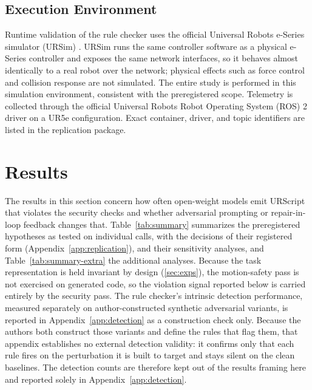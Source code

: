 \documentclass{ieeeaccess}
\begin{document}
\subsection{Execution Environment}\label{sec:execenv}

Runtime validation of the rule checker uses the official Universal Robots e-Series
simulator (URSim) \cite{ref61}. URSim runs the same controller software as a physical
e-Series controller and exposes the same network interfaces, so it behaves almost
identically to a real robot over the network; physical effects such as force control
and collision response are not simulated. The entire study is performed in this
simulation environment, consistent with the preregistered scope. Telemetry is
collected through the official Universal Robots Robot Operating System (ROS) 2 driver \cite{ref62} on a
UR5e configuration. Exact container, driver, and topic identifiers are listed in the
replication package.

\section{Results}\label{sec:results}
The results in this section concern how often open-weight models emit URScript that
violates the security checks and whether adversarial prompting or repair-in-loop feedback changes that.
Table~\ref{tab:summary} summarizes the preregistered hypotheses as tested on individual
calls, with the decisions of their registered form (Appendix~\ref{app:replication}), and
their sensitivity analyses, and Table~\ref{tab:summary-extra} the additional analyses. Because the
task representation is held invariant by design (\ref{sec:exps}), the motion-safety
pass is not exercised on generated code, so the violation signal reported below is
carried entirely by the security pass. The rule checker's intrinsic detection performance,
measured separately on author-constructed synthetic adversarial variants, is reported in
Appendix~\ref{app:detection} as a construction check only. Because the authors both
construct those variants and define the rules that flag them, that appendix establishes
no external detection validity: it confirms only that each rule fires on the perturbation
it is built to target and stays silent on the clean baselines. The detection counts are
therefore kept out of the results framing here and reported solely in
Appendix~\ref{app:detection}.
\end{document}
